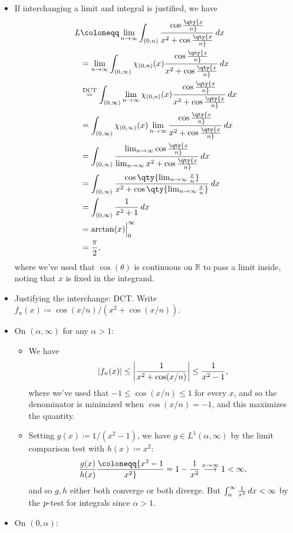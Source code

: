 \begin{solution}

\begin{itemize}
\item
  If interchanging a limit and integral is justified, we have
  \begin{align*}
  L 
  &\coloneqq\lim_{n\to \infty} \int_{(0, n)} {\cos\qty{x\over n} \over x^2 + \cos\qty{x\over n} } \,dx\\
  &= \lim_{n\to \infty} \int_{(0, \infty)} \chi_{(0, n)}(x) {\cos\qty{x\over n} \over x^2 + \cos\qty{x\over n} } \,dx\\
  &\overset{\text{DCT}}{=} \int_{(0, \infty)} \lim_{n\to \infty} \chi_{(0, n)}(x) {\cos\qty{x\over n} \over x^2 + \cos\qty{x\over n} } \,dx\\
  &= \int_{(0, \infty)} \chi_{(0, \infty)}(x) \lim_{n\to \infty} {\cos\qty{x\over n} \over x^2 + \cos\qty{x\over n} } \,dx\\
  &= \int_{(0, \infty)} {\lim_{n\to \infty} \cos\qty{x\over n} \over \lim_{n\to \infty} x^2 + \cos\qty{x\over n} } \,dx\\
  &= \int_{(0, \infty)} {\cos\qty{\lim_{n\to \infty} {x\over n} } \over x^2 + \cos\qty{\lim_{n\to \infty} {x\over n} } } \,dx\\
  &= \int_{(0, \infty)} {1\over x^2 + 1}\,dx\\
  &= \arctan(x)\Big|_0^\infty \\
  &= {\pi \over 2}
  ,\end{align*}
  where we've used that \(\cos(\theta)\) is continuous on
  \({\mathbb{R}}\) to pass a limit inside, noting that \(x\) is fixed in
  the integrand.
\item
  Justifying the interchange: DCT. Write
  \(f_n(x) \coloneqq\cos(x/n) / (x^2 + \cos(x/n))\).
\item
  On \((\alpha, \infty)\) for any \(\alpha > 1\):

  \begin{itemize}
  \tightlist
  \item
    We have
    \begin{align*}
    {\left\lvert {f_n(x)} \right\rvert} \leq 
    {\left\lvert {1\over x^2 + \cos(x/n)} \right\rvert} \leq {1\over x^2-1}
    ,\end{align*}
    where we've used that \(-1\leq \cos(x/n) \leq 1\) for every \(x\),
    and so the denominator is minimized when \(\cos(x/n) = -1\), and
    this maximizes the quantity.
  \item
    Setting \(g(x) \coloneqq 1/(x^2-1)\), we have
    \(g\in L^1(\alpha, \infty)\) by the limit comparison test with
    \(h(x) \coloneqq x^2\):
    \begin{align*}
    {g(x) \over h(x) } \coloneqq{x^2 -1 \over x^2 } = 1 - {1\over x^2} \overset{x\to \infty}\longrightarrow 1 < \infty
    ,\end{align*}
    and so \(g, h\) either both converge or both diverge. But
    \(\int_\alpha^\infty {1\over x^2}\,dx< \infty\) by the
    \(p{\hbox{-}}\)test for integrals since \(\alpha>1\).
  \end{itemize}
\item
  On \((0, \alpha)\):


\end{itemize}
\end{solution}
